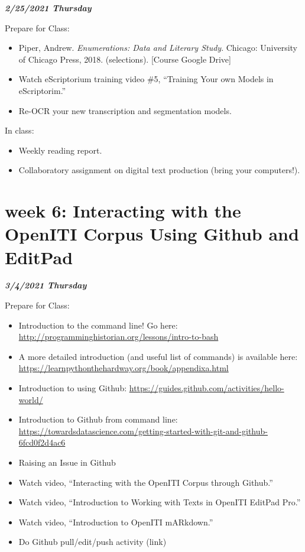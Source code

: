 \documentclass[
]{book}
\providecommand{\tightlist}{%
  \setlength{\itemsep}{0pt}\setlength{\parskip}{0pt}}
\begin{document}
\textbf{\emph{2/25/2021 Thursday}}

Prepare for Class:

\begin{itemize}
\tightlist
\item
  Piper, Andrew. \emph{Enumerations: Data and Literary Study}. Chicago: University of Chicago Press, 2018. (selections). {[}Course Google Drive{]}
\item
  Watch eScriptorium training video \#5, ``Training Your own Models in eScriptorim.''
\item
  Re-OCR your new transcription and segmentation models.
\end{itemize}

In class:

\begin{itemize}
\tightlist
\item
  Weekly reading report.
\item
  Collaboratory assignment on digital text production (bring your computers!).
\end{itemize}

\hypertarget{week-6-interacting-with-the-openiti-corpus-using-github-and-editpad-1}{%
\chapter{week 6: Interacting with the OpenITI Corpus Using Github and EditPad}\label{week-6-interacting-with-the-openiti-corpus-using-github-and-editpad-1}}

\textbf{\emph{3/4/2021 Thursday}}

Prepare for Class:

\begin{itemize}
\tightlist
\item
  Introduction to the command line! Go here: \url{http://programminghistorian.org/lessons/intro-to-bash}
\item
  A more detailed introduction (and useful list of commands) is available here: \url{https://learnpythonthehardway.org/book/appendixa.html}
\item
  Introduction to using Github: \url{https://guides.github.com/activities/hello-world/}
\item
  Introduction to Github from command line: \url{https://towardsdatascience.com/getting-started-with-git-and-github-6fcd0f2d4ac6}
\item
  Raising an Issue in Github
\item
  Watch video, ``Interacting with the OpenITI Corpus through Github.''
\item
  Watch video, ``Introduction to Working with Texts in OpenITI EditPad Pro.''
\item
  Watch video, ``Introduction to OpenITI mARkdown.''
\item
  Do Github pull/edit/push activity (link)
\end{itemize}
\end{document}
